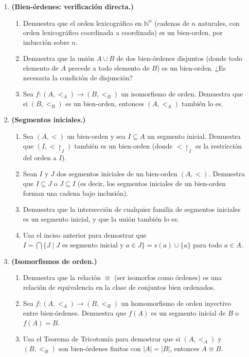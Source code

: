 \begin{enumerate}[leftmargin=2em, label=\textbf{\arabic*.}]
  \item \textbf{(Bien-órdenes: verificación directa.)}
  \begin{enumerate}[label=(\alph*)]
    \item Demuestra que el orden lexicográfico en $\mathbb{N}^n$ (cadenas de $n$ naturales, con orden lexicográfico coordinada a coordinada) es un bien-orden, por inducción sobre $n$.
    \item Demuestra que la unión $A \cup B$ de dos bien-órdenes disjuntos (donde todo elemento de $A$ precede a todo elemento de $B$) es un bien-orden. ¿Es necesaria la condición de disjunción?
    \item Sea $f: (A, <_A) \to (B, <_B)$ un isomorfismo de orden. Demuestra que si $(B, <_B)$ es un bien-orden, entonces $(A, <_A)$ también lo es.
  \end{enumerate}

  \item \textbf{(Segmentos iniciales.)}
  \begin{enumerate}[label=(\alph*)]
    \item Sea $(A, <)$ un bien-orden y sea $I \subseteq A$ un segmento inicial. Demuestra que $(I, <\!\restriction_I)$ también es un bien-orden (donde $<\!\restriction_I$ es la restricción del orden a $I$).
    \item Sean $I$ y $J$ dos segmentos iniciales de un bien-orden $(A, <)$. Demuestra que $I \subseteq J$ o $J \subseteq I$ (es decir, los segmentos iniciales de un bien-orden forman una cadena bajo inclusión).
    \item Demuestra que la intersección de cualquier familia de segmentos iniciales es un segmento inicial, y que la unión también lo es.
    \item Usa el inciso anterior para demostrar que $I = \bigcap\{J \mid J \text{ es segmento inicial y } a \in J\} = s(a) \cup \{a\}$ para todo $a \in A$.
  \end{enumerate}

  \item \textbf{(Isomorfismos de orden.)}
  \begin{enumerate}[label=(\alph*)]
    \item Demuestra que la relación $\cong$ (ser isomorfos como órdenes) es una relación de equivalencia en la clase de conjuntos bien ordenados.
    \item Sea $f: (A, <_A) \to (B, <_B)$ un homomorfismo de orden inyectivo entre bien-órdenes. Demuestra que $f(A)$ es un segmento inicial de $B$ o $f(A) = B$.
    \item Usa el Teorema de Tricotomía para demostrar que si $(A, <_A)$ y $(B, <_B)$ son bien-órdenes finitos con $|A| = |B|$, entonces $A \cong B$.
  \end{enumerate}


\end{enumerate}
